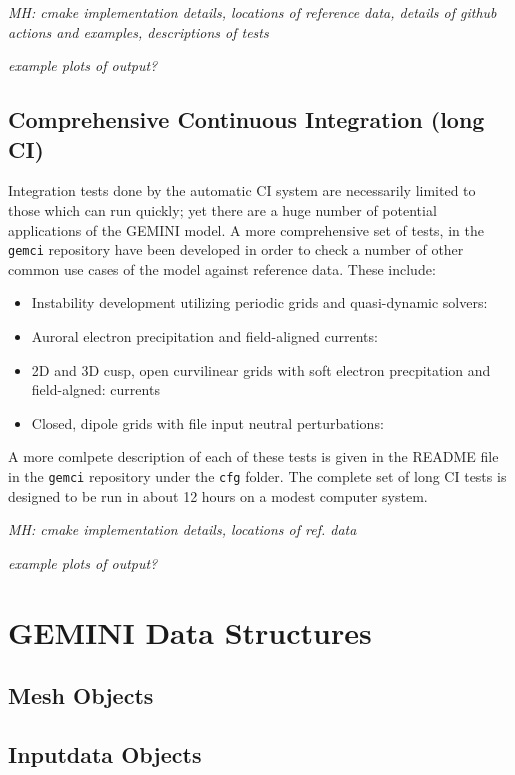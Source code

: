 \documentclass[11pt,letterpaper]{article}
\begin{document}
\emph{MH:  cmake implementation details, locations of reference data, details of github actions and examples, descriptions of tests}

\emph{example plots of output?}

\subsection{Comprehensive Continuous Integration (long CI)}

Integration tests done by the automatic CI system are necessarily limited to those which can run quickly; yet there are a huge number of potential applications of the GEMINI model.  A more comprehensive set of tests, in the \texttt{gemci} repository have been developed in order to check a number of other common use cases of the model against reference data.  These include:
\begin{itemize}
  \item Instability development utilizing periodic grids and quasi-dynamic solvers:  
  \item Auroral electron precipitation and field-aligned currents:  
  \item 2D and 3D cusp, open curvilinear grids with soft electron precpitation and field-algned:   currents
  \item Closed, dipole grids with file input neutral perturbations:  
\end{itemize}
A more comlpete description of each of these tests is given in the README file in the \texttt{gemci} repository under the \texttt{cfg} folder.  The complete set of long CI tests is designed to be run in about 12 hours on a modest computer system.  

\emph{MH:  cmake implementation details, locations of ref. data}

\emph{example plots of output?}



\section{GEMINI Data Structures}

\subsection{Mesh Objects}

\subsection{Inputdata Objects}
\end{document}

